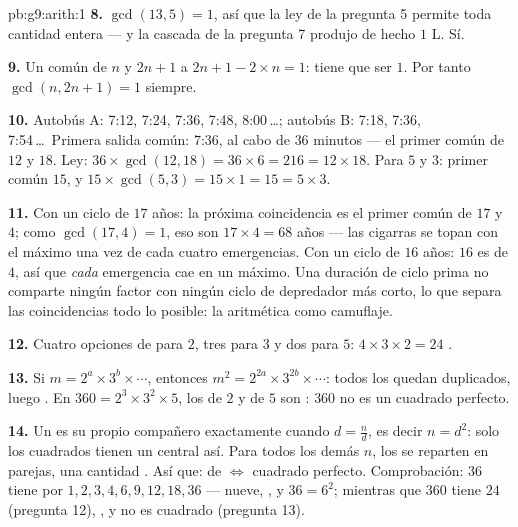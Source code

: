\begin{solution}{pb:g9:arith:1}
\textbf{8.} $\gcd(13, 5) = 1$, así que la ley de la pregunta 5 permite
toda cantidad entera --- y la cascada de la pregunta 7 produjo
de hecho $1$ L. Sí.

\textbf{9.} Un  común de $n$ y $2n + 1$  a
$2n + 1 - 2 \times n = 1$: tiene que ser $1$. Por tanto
$\gcd(n, 2n+1) = 1$ siempre.

\textbf{10.} Autobús A: 7:12, 7:24, 7:36, 7:48, 8:00\,\dots; autobús B:
7:18, 7:36, 7:54\,\dots\ Primera salida común: 7:36, al cabo de
$36$ minutos --- el primer  común de $12$ y $18$.
Ley: $36 \times \gcd(12, 18) = 36 \times 6 = 216 = 12 \times
18$. Para $5$ y $3$: primer  común $15$, y
$15 \times \gcd(5,3) = 15 \times 1 = 15 = 5 \times 3$.

\textbf{11.} Con un ciclo de $17$ años: la próxima coincidencia es
el primer  común de $17$ y $4$; como
$\gcd(17, 4) = 1$, eso son $17 \times 4 = 68$ años --- las
cigarras se topan con el máximo una vez de cada cuatro emergencias. Con un
ciclo de $16$ años: $16$ es  de $4$, así que \emph{cada}
emergencia cae en un máximo. Una duración de ciclo prima no comparte ningún factor
con ningún ciclo de depredador más corto, lo que separa las coincidencias todo lo
posible: la aritmética como camuflaje.

\textbf{12.} Cuatro opciones de  para $2$, tres para $3$
y dos para $5$: $4 \times 3 \times 2 = 24$ .

\textbf{13.} Si $m = 2^{a} \times 3^{b} \times \cdots$, entonces
$m^2 = 2^{2a} \times 3^{2b} \times \cdots$: todos los  quedan
duplicados, luego . En $360 = 2^3 \times 3^2 \times 5$, los
 de $2$ y de $5$ son : $360$ no es un cuadrado
perfecto.

\textbf{14.} Un  es su propio compañero exactamente cuando
$d = \frac nd$, es decir $n = d^2$: solo los cuadrados tienen un
 central así. Para todos los demás $n$, los  se reparten en
parejas, una cantidad . Así que:  de 
$\Leftrightarrow$ cuadrado perfecto. Comprobación: $36$ tiene por 
$1, 2, 3, 4, 6, 9, 12, 18, 36$ --- nueve, , y
$36 = 6^2$; mientras que $360$ tiene $24$ (pregunta 12), , y no es
cuadrado (pregunta 13).


\end{solution}
